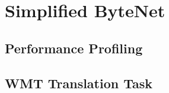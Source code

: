 \section{Simplified ByteNet}

\subsection{Performance Profiling}

\subsection{WMT Translation Task}
